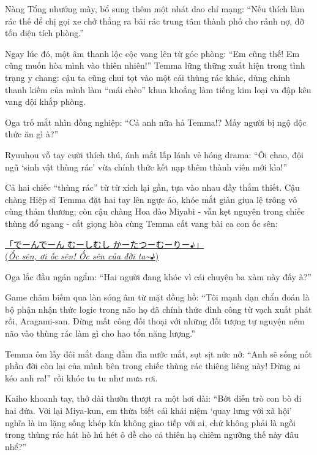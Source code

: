 \documentclass[../main.tex]{subfiles}
\begin{document}
Nàng Tổng nhướng mày, bổ sung thêm một nhát dao chí mạng: ``Nếu thích làm rác thế để chị gọi xe chở thẳng ra bãi rác trung tâm thành phố cho rảnh nợ, đỡ tốn diện tích phòng.''

Ngay lúc đó, một âm thanh lộc cộc vang lên từ góc phòng: ``Em cũng thế! Em cũng muốn hòa mình vào thiên nhiên!'' Temma lững thững xuất hiện trong tình trạng y chang: cậu ta cũng chui tọt vào một cái thùng rác khác, dùng chính thanh kiếm của mình làm ``mái chèo'' khua khoắng làm tiếng kim loại va đập kêu vang dội khắp phòng.


Oga trố mắt nhìn đồng nghiệp: ``Cả anh nữa hả Temma!? Mấy người bị ngộ độc thức ăn gì à?''

Ryuuhou vỗ tay cười thích thú, ánh mắt lấp lánh vẻ hóng drama: ``Ôi chao, đội ngũ `sinh vật thùng rác' vừa chính thức kết nạp thêm thành viên mới kìa!''

Cả hai chiếc ``thùng rác'' từ từ xích lại gần, tựa vào nhau đầy thắm thiết. Cậu chàng Hiệp sĩ Temma đặt hai tay lên ngực áo, khóe mắt giàn giụa lệ trông vô cùng thảm thương; còn cậu chàng Hoa đào Miyabi - vẫn kẹt nguyên trong chiếc thùng đổ ngang - cất giọng hòa cùng Temma cất vang bài ca con ốc sên:

\begin{center}
    \uline{「でーんでーん むーしむし かーたつーむーりー♪」\\(\textit{Ốc sên, ơi ốc sên! Ốc sên của đời ta\~{}}♪)}
\end{center}


Oga lắc đầu ngán ngẩm: ``Hai người đang khóc vì cái chuyện ba xàm này đấy à?''

Game châm biếm qua làn sóng âm từ mặt đồng hồ: ``Tôi mạnh dạn chẩn đoán là bộ phận nhận thức logic trong não họ đã chính thức đình công từ vạch xuất phát rồi, Aragami-san. Đừng mất công đối thoại với những đối tượng tự nguyện ném não vào thùng rác làm gì cho hao tổn năng lượng.''

Temma ôm lấy đôi mắt đang đầm đìa nước mắt, sụt sịt nức nở: ``Anh sẽ sống nốt phần đời còn lại của mình bên trong chiếc thùng rác thiêng liêng này! Đừng ai kéo anh ra!'' rồi khóc tu tu như mưa rơi.

Kaiho khoanh tay, thở dài thườn thượt ra một hơi dài: ``Bớt diễn trò con bò đi hai đứa. Với lại Miya-kun, em thừa biết cái khái niệm `quay lưng với xã hội' nghĩa là im lặng sống khép kín không giao tiếp với ai, chứ không phải là ngồi trong thùng rác hát hò hú hét ô dề cho cả thiên hạ chiêm ngưỡng thế này đâu nhể?''
\end{document}
